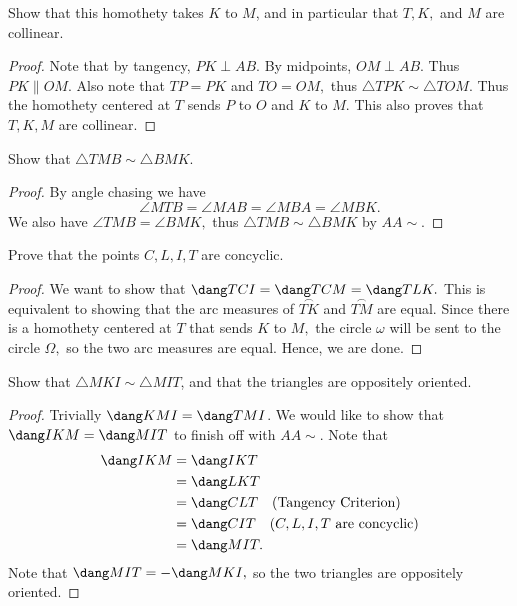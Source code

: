 \documentclass[letterpaper,oneside]{scrartcl}
\begin{document}
\begin{problem*}
  [4.31]
  Show that this homothety takes $K$ to $M$, and in particular that $T,K,$ and $M$ are collinear.
\end{problem*}
\begin{proof}
  Note that by tangency, $PK \perp AB.$ By midpoints, $OM \perp AB.$ Thus $PK \parallel OM.$ Also note that $TP=PK$ and $TO=OM,$ thus $\triangle TPK \sim \triangle TOM.$ Thus the homothety centered at $T$ sends $P$ to $O$ and $K$ to $M.$ This also proves that $T,K,M$ are collinear. 
\end{proof}
\begin{problem*}
  [4.32]
  Show that $\triangle TMB \sim \triangle BMK.$
\end{problem*}
\begin{proof}
  By angle chasing we have
  $$\angle MTB = \angle MAB = \angle MBA = \angle MBK.$$
  We also have $\angle TMB = \angle BMK,$ thus $\triangle TMB \sim \triangle BMK$ by $AA\sim$.
\end{proof}
\begin{problem*}
  [4.34]
  Prove that the points $C,L,I,T$ are concyclic.
\end{problem*}
\begin{proof}
  We want to show that $\dang TCI = \dang TCM = \dang TLK.$ This is equivalent to showing that the arc measures of $\overset{\frown}{TK}$ and $\overset{\frown}{TM}$ are equal. Since there is a homothety centered at $T$ that sends $K$ to $M,$ the circle $\omega$ will be sent to the circle $\Omega,$ so the two arc measures are equal. Hence, we are done.
\end{proof}
\begin{problem*}
  [4.35] Show that \(\triangle MKI \sim \triangle MIT\), and that the triangles are oppositely oriented. 
\end{problem*}
\begin{proof}
  Trivially \(\dang KMI = \dang TMI\). We would like to show that \(\dang IKM = \dang MIT\) to finish off with \(AA \sim\). Note that 
  \begin{align*}
    \dang IKM &= \dang IKT \\
    &= \dang LKT \\
    &= \dang CLT \quad \text{(Tangency Criterion)}\\
    &= \dang CIT \quad (C,L,I,T \text{ are concyclic})\\
    &= \dang MIT.
  \end{align*}
  Note that \(\dang MIT = -\dang MKI,\) so the two triangles are oppositely oriented.
\end{proof}
\end{document}

